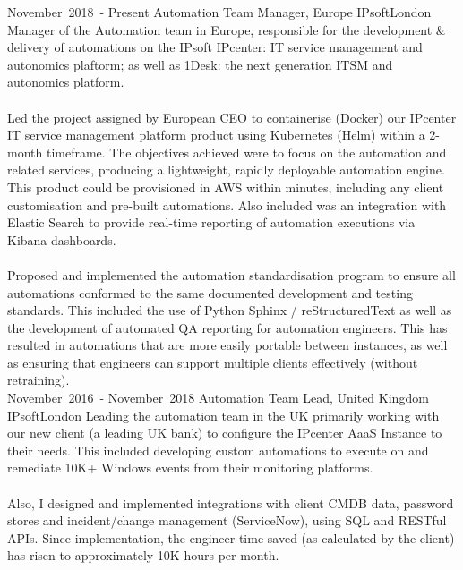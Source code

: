 
\edef\hc{\string:}

\cventry %
  {\mbox{November 2018 -} \mbox{Present}}
  {Automation Team Manager, Europe}
  {IPsoft}{London}{}
  { 
    Manager of the Automation team in Europe, responsible for the 
    development \& delivery of automations on the IPsoft IPcenter: IT service management 
    and autonomics plaftorm; as well as 1Desk: the next generation ITSM and autonomics platform.\\~\\
    Led the project assigned by European CEO to containerise (Docker) our IPcenter 
    IT service management platform product using Kubernetes (Helm) within a 2-month timeframe. 
    The objectives achieved were to focus on the automation and related services, 
    producing a lightweight, rapidly deployable automation engine. 
    This product could be provisioned in AWS within minutes, including any client 
    customisation and pre-built automations. 
    Also included was an integration with Elastic Search to provide real-time 
    reporting of automation executions via Kibana dashboards.\\~\\
    Proposed and implemented the automation standardisation program to ensure all 
    automations conformed to the same documented development and testing standards. 
    This included the use of Python Sphinx / reStructuredText as well as the development 
    of automated QA reporting for automation engineers. 
    This has resulted in automations that are more easily portable between instances, 
    as well as ensuring that engineers can support multiple clients effectively (without retraining).\\ 
  }
\cventry %
  {\mbox{November 2016 -} \mbox{November 2018}}
  {Automation Team Lead, United Kingdom}
  {IPsoft}{London}{}
  {
    Leading the automation team in the UK primarily working with our new client (a leading UK bank) to 
    configure the IPcenter AaaS Instance to their needs. This included developing custom 
    automations to execute on and remediate 10K+ Windows events from their monitoring platforms.\\~\\ 
    Also, I designed and implemented integrations with client CMDB data, password stores 
    and incident/change management (ServiceNow), using SQL and RESTful APIs. Since 
    implementation, the engineer time saved (as calculated by the client) has risen to approximately 
    10K hours per month.\\
  }


